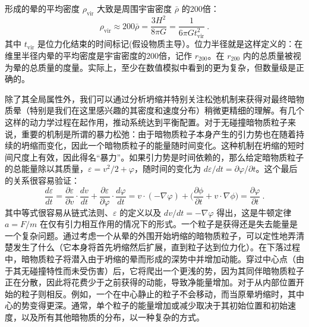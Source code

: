 形成的晕的平均密度 \(\rho_{\text{vir}}\) 大致是周围宇宙密度 \(\bar{\rho}\) 的200倍：
\begin{equation}
\rho_{\text{vir}} \approx 200 \bar{\rho} = \frac{3H^2}{8\pi G} = \frac{1}{6\pi G t^2_{\text{vir}}}~. 
\end{equation}
其中 \(t_{\text{vir}}\) 是位力化结束的时间标记(假设物质主导）。位力半径就是这样定义的：在维里半径内晕的平均密度是宇宙密度的$200$倍，记作 \(r_{200}\)。在 \(r_{200}\) 内的总质量被视为晕的总质量的度量。实际上，至少在数值模拟中看到的更为复杂，但数量级是正确的。

除了其全局属性外，我们可以通过分析坍缩并特别关注松弛机制来获得对最终暗物质晕（特别是我们在这里感兴趣的其密度和速度分布）稍微更精细的理解。有几个这样的动力学过程在起作用，推动系统达到平衡配置。对于无碰撞暗物质粒子来说，重要的机制是所谓的暴力松弛：由于暗物质粒子本身产生的引力势也在随着持续的坍缩而变化，因此一个暗物质粒子的能量随时间变化。这种机制在坍缩的短时间尺度上有效，因此得名“暴力”。如果引力势是时间依赖的，那么给定暗物质粒子的总能量除以其质量，\(\varepsilon = v^2/2 + \varphi\)，随时间的变化为 \(d\varepsilon/dt = \partial\varphi/\partial t\)。这个最后的关系很容易验证：
\begin{equation}
\frac{d\varepsilon}{dt} = \frac{\partial\varepsilon}{\partial v} \cdot \frac{dv}{dt} + \frac{\partial\varepsilon}{\partial\varphi} \cdot \frac{d\varphi}{dt} = v \cdot (-\nabla\varphi) +  \bigg(\frac{\partial\phi}{\partial t} + v \cdot \nabla\phi \bigg) =  \frac{\partial\varphi}{\partial t}~. 
\end{equation}
其中等式很容易从链式法则、\(\varepsilon\) 的定义以及 \(dv/dt = -\nabla\varphi\) 得出，这是牛顿定律 \(a = F/m\) 在仅有引力相互作用的情况下的形式。一个粒子是获得还是失去能量是一个复杂问题。通过考虑一个从晕的外围开始坍缩的暗物质粒子，可以定性地弄清楚发生了什么（它本身将首先坍缩然后扩展，直到粒子达到位力化）。在下落过程中，暗物质粒子将潜入由于坍缩的晕而形成的深势中并增加动能。穿过中心点（由于其无碰撞特性而未受伤害）后，它将爬出一个更浅的势，因为其同伴暗物质粒子正在分散，因此将花费少于之前获得的动能，导致净能量增加。对于从内部位置开始的粒子则相反。例如，一个在中心静止的粒子不会移动，而当原晕坍缩时，其中心的势变得更深。通常，单个粒子的能量增加或减少取决于其初始位置和初始速度，以及所有其他暗物质的分布，以一种复杂的方式。

